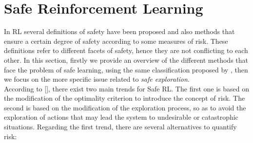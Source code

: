\section{Safe Reinforcement Learning}\label{sec:saferl}
In \ac{RL} several definitions of safety have been proposed and also methods that ensure a certain degree of safety according to some measures of risk. These definitions refer to different facets of safety, hence they are not conflicting to each other. In this section, firstly we provide an overview of the different methods that face the problem of safe learning, using the same classification proposed by \citeauthor{JMLR:v16:garcia15a}, then we focus on the more specific issue related to \emph{safe exploration}.\\
\newline
According to [\cite{JMLR:v16:garcia15a}], there exist two main trends for Safe \ac{RL}. The first one is based on the modification of the optimality criterion to introduce the concept of risk. The second is based on the modification of the exploration process, so as to avoid the exploration of actions that may lead the system to undesirable or catastrophic situations. Regarding the first trend, there are several alternatives to quantify risk:
